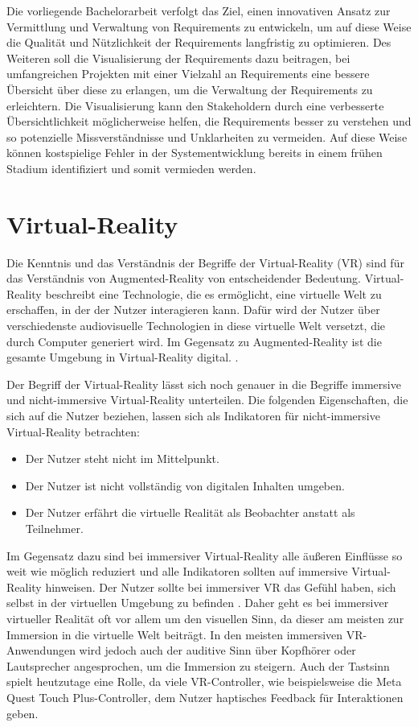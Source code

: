     Die vorliegende Bachelorarbeit verfolgt das Ziel, einen innovativen Ansatz zur Vermittlung und Verwaltung von Requirements zu entwickeln, um auf diese Weise die Qualität und Nützlichkeit der Requirements langfristig zu optimieren.
    Des Weiteren soll die Visualisierung der Requirements dazu beitragen, bei umfangreichen Projekten mit einer Vielzahl an Requirements eine bessere Übersicht über diese zu erlangen, um die Verwaltung der Requirements zu erleichtern.
    Die Visualisierung kann den Stakeholdern durch eine verbesserte Übersichtlichkeit möglicherweise helfen, die Requirements besser zu verstehen und so potenzielle Missverständnisse und Unklarheiten zu vermeiden.
    Auf diese Weise können kostspielige Fehler in der Systementwicklung bereits in einem frühen Stadium identifiziert und somit vermieden werden.
    


  \section{Virtual-Reality}
  Die Kenntnis und das Verständnis der Begriffe der Virtual-Reality (VR) sind für das Verständnis von Augmented-Reality von entscheidender Bedeutung.
  Virtual-Reality beschreibt eine Technologie, die es ermöglicht, eine virtuelle Welt zu erschaffen, in der der Nutzer interagieren kann.
  Dafür wird der Nutzer über verschiedenste audiovisuelle Technologien in diese virtuelle Welt versetzt, die durch Computer generiert wird.
  Im Gegensatz zu Augmented-Reality ist die gesamte Umgebung in Virtual-Reality digital. \autocite[vgl.][S.15]{Dalton2023}.

  Der Begriff der Virtual-Reality lässt sich noch genauer in die Begriffe immersive und nicht-immersive Virtual-Reality unterteilen.
  Die folgenden Eigenschaften, die sich auf die Nutzer beziehen, lassen sich als Indikatoren für nicht-immersive Virtual-Reality betrachten:
  \begin{itemize}
    \item Der Nutzer steht nicht im Mittelpunkt.
    \item Der Nutzer ist nicht vollständig von digitalen Inhalten umgeben.
    \item Der Nutzer erfährt die virtuelle Realität als Beobachter anstatt als Teilnehmer.
  \end{itemize}
  Im Gegensatz dazu sind bei immersiver Virtual-Reality alle äußeren Einflüsse so weit wie möglich reduziert und alle Indikatoren sollten auf immersive Virtual-Reality hinweisen.
  Der Nutzer sollte bei immersiver VR das Gefühl haben, sich selbst in der virtuellen Umgebung zu befinden \autocite[vgl.][S.23-24]{Wolfel2023}.
  Daher geht es bei immersiver virtueller Realität oft vor allem um den visuellen Sinn, da dieser am meisten zur Immersion in die virtuelle Welt beiträgt.
  In den meisten immersiven VR-Anwendungen wird jedoch auch der auditive Sinn über Kopfhörer oder Lautsprecher angesprochen, um die Immersion zu steigern.
  Auch der Tastsinn spielt heutzutage eine Rolle, da viele VR-Controller, wie beispielsweise die Meta Quest Touch Plus-Controller, dem Nutzer haptisches Feedback für Interaktionen geben.

